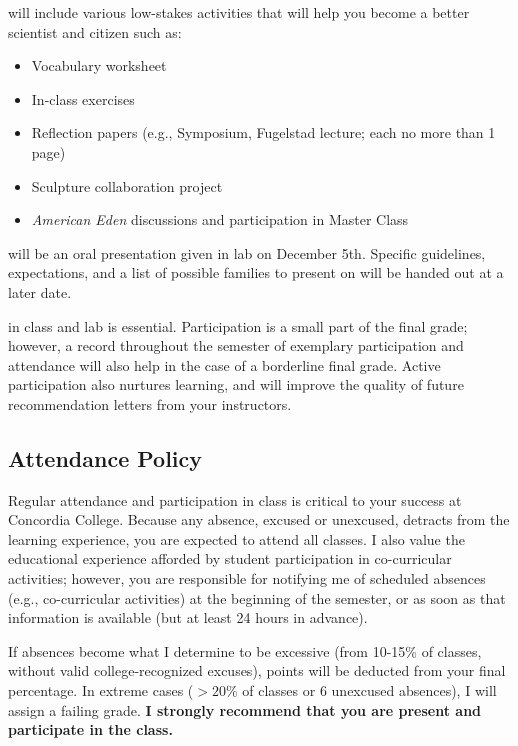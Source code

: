 \documentclass{tufte-handout}
\begin{document}
\begin{fullwidth}
 will include various low-stakes activities that will help you become a better scientist and citizen such as:

\begin{itemize}
	\item Vocabulary worksheet
	\item In-class exercises
	\item Reflection papers (e.g., Symposium, Fugelstad lecture; each no more than 1 page)
	\item Sculpture collaboration project
	\item \emph{American Eden} discussions and participation in Master Class
\end{itemize}

 will be an oral presentation given in lab on December 5th. Specific guidelines, expectations, and a list of possible families to present on will be handed out at a later date.


 in class and lab is essential. Participation is a small part of the final grade; however, a record throughout the semester of exemplary participation and attendance will also help in the case of a borderline final grade. Active participation also nurtures learning, and will improve the quality of future recommendation letters from your instructors.  



\subsection{Attendance Policy}

Regular attendance and participation in class is critical to your success at Concordia College. Because any absence, excused or unexcused, detracts from the learning experience, you are expected to attend all classes. I also value the educational experience afforded by student participation in co-curricular activities; however, you are responsible for notifying me of scheduled absences (e.g., co-curricular activities) at the beginning of the semester, or as soon as that information is available (but at least 24 hours in advance). 

If absences become what I determine to be excessive (from 10-15\% of classes, without valid college-recognized excuses), points will be deducted from your final percentage. In extreme cases ($>20$\% of classes or 6 unexcused absences), I will assign a failing grade. \textbf{I strongly recommend that you are present and participate in the class.}


\end{fullwidth}
\end{document}

